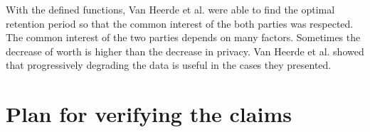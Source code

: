 \documentclass[a4paper,12pt,oneside,fleqn]{article}
\begin{document}
With the defined functions, Van Heerde et al. were able to find the
optimal retention period so that the common interest of the both
parties was respected.\\

The common interest of the two parties depends on many
factors. Sometimes the decrease of worth is higher than the decrease
in privacy. Van Heerde et al. showed that progressively degrading the
data is useful in the cases they presented.

\section{Plan for verifying the claims}
\end{document}
